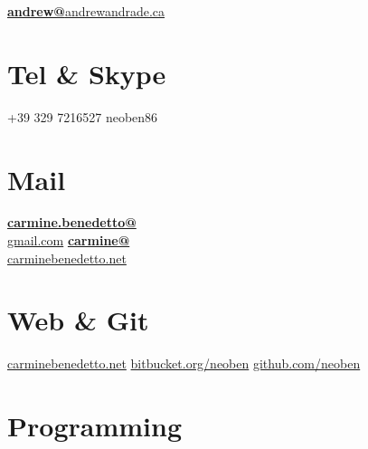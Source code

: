 \documentclass[]{friggeri-cv}
\begin{document}
      {\href{mailto:andrew@andrewandrade.ca}{\textbf{andrew@}}\href{http://www.mrandrewandrade.com/?utm_source=pm_resume&utm_medium=pm_resume&utm_campaign=pm_resume}{andrewandrade.ca}}
      

    
  \section{Tel \& Skype}
    +39 329 7216527
    neoben86
    ~
  \section{Mail}
    \href{mailto:carmine.benedetto@gmail.com}{\textbf{carmine.benedetto@}\\gmail.com}
    \href{mailto:carmine@carminebenedetto.net}{\textbf{carmine@}\\carminebenedetto.net}
    ~
  \section{Web \& Git}
    \href{http://www.carminebenedetto.net}{carminebenedetto.net}
    \href{https://bitbucket.org/neoben}{bitbucket.org/neoben}
    \href{https://github.com/neoben}{github.com/neoben}
    ~
  \section{Programming}
    ~
\end{document}
